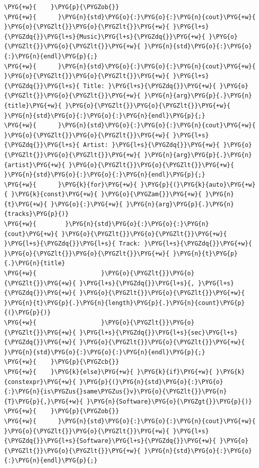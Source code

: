 \begin{itemize}
\begin{codeblockbg}
\begin{Verbatim}[commandchars=\\\{\},breaklines=true,breakanywhere=true,fontsize=\codefont,xleftmargin=17bp]
\PYG{+w}{    }\PYG{p}{\PYGZob{}}
\PYG{+w}{      }\PYG{n}{std}\PYG{o}{:}\PYG{o}{:}\PYG{n}{cout}\PYG{+w}{ }\PYG{o}{\PYGZlt{}}\PYG{o}{\PYGZlt{}}\PYG{+w}{ }\PYG{l+s}{\PYGZdq{}}\PYG{l+s}{Music}\PYG{l+s}{\PYGZdq{}}\PYG{+w}{ }\PYG{o}{\PYGZlt{}}\PYG{o}{\PYGZlt{}}\PYG{+w}{ }\PYG{n}{std}\PYG{o}{:}\PYG{o}{:}\PYG{n}{endl}\PYG{p}{;}
\PYG{+w}{      }\PYG{n}{std}\PYG{o}{:}\PYG{o}{:}\PYG{n}{cout}\PYG{+w}{ }\PYG{o}{\PYGZlt{}}\PYG{o}{\PYGZlt{}}\PYG{+w}{ }\PYG{l+s}{\PYGZdq{}}\PYG{l+s}{ Title: }\PYG{l+s}{\PYGZdq{}}\PYG{+w}{ }\PYG{o}{\PYGZlt{}}\PYG{o}{\PYGZlt{}}\PYG{+w}{ }\PYG{n}{arg}\PYG{p}{.}\PYG{n}{title}\PYG{+w}{ }\PYG{o}{\PYGZlt{}}\PYG{o}{\PYGZlt{}}\PYG{+w}{ }\PYG{n}{std}\PYG{o}{:}\PYG{o}{:}\PYG{n}{endl}\PYG{p}{;}
\PYG{+w}{      }\PYG{n}{std}\PYG{o}{:}\PYG{o}{:}\PYG{n}{cout}\PYG{+w}{ }\PYG{o}{\PYGZlt{}}\PYG{o}{\PYGZlt{}}\PYG{+w}{ }\PYG{l+s}{\PYGZdq{}}\PYG{l+s}{ Artist: }\PYG{l+s}{\PYGZdq{}}\PYG{+w}{ }\PYG{o}{\PYGZlt{}}\PYG{o}{\PYGZlt{}}\PYG{+w}{ }\PYG{n}{arg}\PYG{p}{.}\PYG{n}{artist}\PYG{+w}{ }\PYG{o}{\PYGZlt{}}\PYG{o}{\PYGZlt{}}\PYG{+w}{ }\PYG{n}{std}\PYG{o}{:}\PYG{o}{:}\PYG{n}{endl}\PYG{p}{;}
\PYG{+w}{      }\PYG{k}{for}\PYG{+w}{ }\PYG{p}{(}\PYG{k}{auto}\PYG{+w}{ }\PYG{k}{const}\PYG{+w}{ }\PYG{o}{\PYGZam{}}\PYG{+w}{ }\PYG{n}{t}\PYG{+w}{ }\PYG{o}{:}\PYG{+w}{ }\PYG{n}{arg}\PYG{p}{.}\PYG{n}{tracks}\PYG{p}{)}
\PYG{+w}{        }\PYG{n}{std}\PYG{o}{:}\PYG{o}{:}\PYG{n}{cout}\PYG{+w}{ }\PYG{o}{\PYGZlt{}}\PYG{o}{\PYGZlt{}}\PYG{+w}{ }\PYG{l+s}{\PYGZdq{}}\PYG{l+s}{ Track: }\PYG{l+s}{\PYGZdq{}}\PYG{+w}{ }\PYG{o}{\PYGZlt{}}\PYG{o}{\PYGZlt{}}\PYG{+w}{ }\PYG{n}{t}\PYG{p}{.}\PYG{n}{title}
\PYG{+w}{                  }\PYG{o}{\PYGZlt{}}\PYG{o}{\PYGZlt{}}\PYG{+w}{ }\PYG{l+s}{\PYGZdq{}}\PYG{l+s}{, }\PYG{l+s}{\PYGZdq{}}\PYG{+w}{ }\PYG{o}{\PYGZlt{}}\PYG{o}{\PYGZlt{}}\PYG{+w}{ }\PYG{n}{t}\PYG{p}{.}\PYG{n}{length}\PYG{p}{.}\PYG{n}{count}\PYG{p}{(}\PYG{p}{)}
\PYG{+w}{                  }\PYG{o}{\PYGZlt{}}\PYG{o}{\PYGZlt{}}\PYG{+w}{ }\PYG{l+s}{\PYGZdq{}}\PYG{l+s}{sec}\PYG{l+s}{\PYGZdq{}}\PYG{+w}{ }\PYG{o}{\PYGZlt{}}\PYG{o}{\PYGZlt{}}\PYG{+w}{ }\PYG{n}{std}\PYG{o}{:}\PYG{o}{:}\PYG{n}{endl}\PYG{p}{;}
\PYG{+w}{    }\PYG{p}{\PYGZcb{}}
\PYG{+w}{    }\PYG{k}{else}\PYG{+w}{ }\PYG{k}{if}\PYG{+w}{ }\PYG{k}{constexpr}\PYG{+w}{ }\PYG{p}{(}\PYG{n}{std}\PYG{o}{:}\PYG{o}{:}\PYG{n}{is\PYGZus{}same\PYGZus{}v}\PYG{o}{\PYGZlt{}}\PYG{n}{T}\PYG{p}{,}\PYG{+w}{ }\PYG{n}{Software}\PYG{o}{\PYGZgt{}}\PYG{p}{)}
\PYG{+w}{    }\PYG{p}{\PYGZob{}}
\PYG{+w}{      }\PYG{n}{std}\PYG{o}{:}\PYG{o}{:}\PYG{n}{cout}\PYG{+w}{ }\PYG{o}{\PYGZlt{}}\PYG{o}{\PYGZlt{}}\PYG{+w}{ }\PYG{l+s}{\PYGZdq{}}\PYG{l+s}{Software}\PYG{l+s}{\PYGZdq{}}\PYG{+w}{ }\PYG{o}{\PYGZlt{}}\PYG{o}{\PYGZlt{}}\PYG{+w}{ }\PYG{n}{std}\PYG{o}{:}\PYG{o}{:}\PYG{n}{endl}\PYG{p}{;}

\end{Verbatim}
\end{codeblockbg}
\end{itemize}

